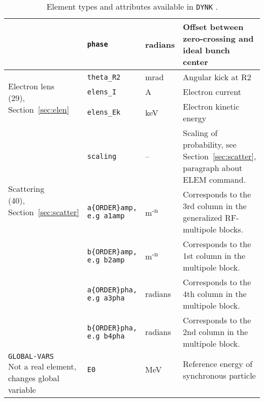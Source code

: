 \begin{longtable}{|l | l | l | p{6cm}|}
    & \texttt{phase}       & radians & Offset between zero-crossing and ideal bunch center \\
  \hline
    \multirow{3}{*}{\parbox{4cm}{Electron lens \\ (29),\\ Section~\ref{sec:elen}}}
    & \texttt{theta\_R2}     & mrad      & Angular kick at R2 \\
    & \texttt{elens\_I}      & A         & Electron current   \\
    & \texttt{elens\_Ek}     & keV       & Electron kinetic energy \\
  \hline
    \multirow{3}{*}{\parbox{4cm}{Scattering \\ (40),\\ Section~\ref{sec:scatter}} }
    & \texttt{scaling}     & --      & Scaling of probability, see Section~\ref{sec:scatter}, paragraph about ELEM command.\\
    \hline
    \multirow{3}{*}{\parbox{4cm}{Generalized RF-multipoles \\ (41),\\ Section~\ref{generalrf}}}
    & \texttt{a\{ORDER\}amp, e.g a1amp}& m\textsuperscript{-n}  & Corresponds to the 3rd column in the generalized RF-multipole blocks. \\
    & \texttt{b\{ORDER\}amp, e.g b2amp}& m\textsuperscript{-n}  & Corresponds to the 1st column in the multipole block. \\
    & \texttt{a\{ORDER\}pha, e.g a3pha}& radians & Corresponds to the 4th column in the multipole block. \\
    & \texttt{b\{ORDER\}pha, e.g b4pha}& radians & Corresponds to the 2nd column in the multipole block. \\
  \hline
    \multirow{3}{*}{\parbox{4cm}{\texttt{GLOBAL-VARS} \\ Not a real element,\\ changes global variable}}
    & \texttt{E0}     & MeV      & Reference energy of synchronous particle \\
    &      &       &  \\
  \hline

\caption{Element types and attributes available in \texttt{DYNK} .}
\label{tab:DYNK_SET}

\end{longtable}

